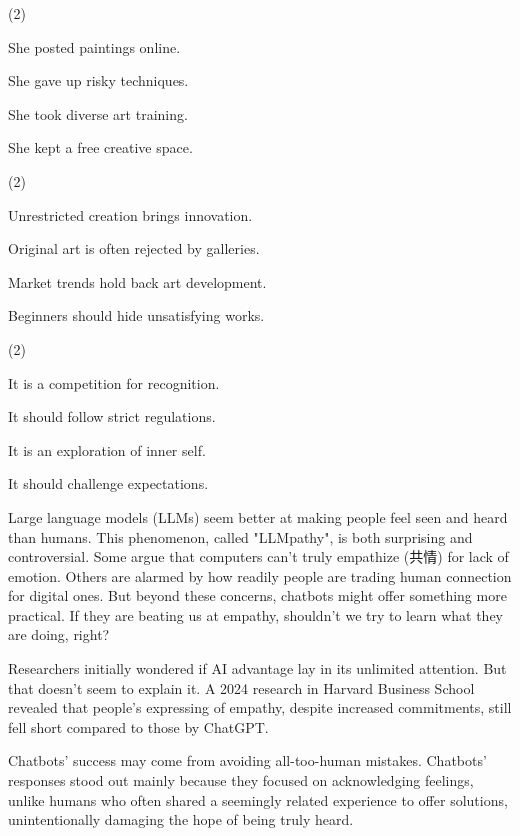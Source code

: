 \documentclass{英语试卷}
\begin{document}
\begin{choices}(2)
  \item She posted paintings online.
  \item She gave up risky techniques.
  \item She took diverse art training.
  \item She kept a free creative space.
\end{choices}
\begin{choices}(2)
  \item Unrestricted creation brings innovation.
  \item Original art is often rejected by galleries.
  \item Market trends hold back art development.
  \item Beginners should hide unsatisfying works.
\end{choices}
\begin{choices}(2)
  \item It is a competition for recognition.
  \item It should follow strict regulations.
  \item It is an exploration of inner self.
  \item It should challenge expectations.
\end{choices}
\par Large language models (LLMs) seem better at making people feel seen and heard than humans. This phenomenon, called "LLMpathy", is both surprising and controversial. Some argue that computers can't truly empathize (共情) for lack of emotion. Others are alarmed by how readily people are trading human connection for digital ones. But beyond these concerns, chatbots might offer something more practical. If they are beating us at empathy, shouldn't we try to learn what they are doing, right?\par
\par Researchers initially wondered if AI advantage lay in its unlimited attention. But that doesn't seem to explain it. A 2024 research in Harvard Business School revealed that people's expressing of empathy, despite increased commitments, still fell short compared to those by ChatGPT.\par
\par Chatbots' success may come from avoiding all-too-human mistakes. Chatbots' responses stood out mainly because they focused on acknowledging feelings, unlike humans who often shared a seemingly related experience to offer solutions, unintentionally damaging the hope of being truly heard.\par
\end{document}
